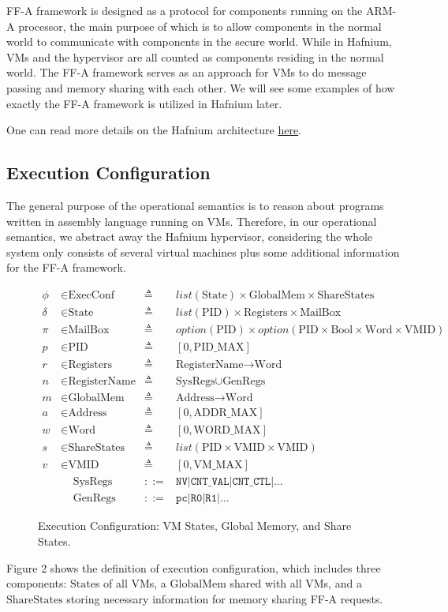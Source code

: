 \documentclass[a4paper]{article}
\newcommand*{\defined}{\triangleq}
\newcommand*{\maps}{\rightarrow}
\newcommand*{\derived}{::=}
\newcommand*{\CONF}{\text{ExecConf}}
\newcommand*{\STATE}{\text{State}}
\newcommand*{\MEM}{\text{GlobalMem}}
\newcommand*{\SSS}{\text{ShareStates}}
\newcommand*{\PID}{\text{PID}}
\newcommand*{\REGS}{\text{Registers}}
\newcommand*{\ADDR}{\text{Address}}
\newcommand*{\WORD}{\text{Word}}
\newcommand*{\VMID}{\text{VMID}}
\newcommand*{\REGNAMES}{\text{RegisterName}}
\newcommand*{\MB}{\text{MailBox}}
\newcommand*{\PAMAX}{\text{ADDR\_MAX}}
\newcommand*{\PPIDMAX}{\text{PID\_MAX}}
\newcommand*{\PWMAX}{\text{WORD\_MAX}}
\newcommand*{\PVMMAX}{\text{VM\_MAX}}
\begin{document}
FF-A framework is designed as a protocol for components running on the ARM-A
processor, the main purpose of which is to allow components in the normal world
to communicate with components in the secure world. While in Hafnium, VMs and
the hypervisor are all counted as components residing in the normal world. The
FF-A framework serves as an approach for VMs to do message passing and
memory sharing with each other. We will see some examples of how exactly the
FF-A framework is utilized in Hafnium later.

One can read more details on the Hafnium architecture
\href{https://review.trustedfirmware.org/plugins/gitiles/hafnium/hafnium/+/HEAD/docs/Architecture.md}{here}.

\subsection{Execution Configuration}
 The general purpose of the operational
semantics is to reason about programs written in assembly language running on
VMs. Therefore, in our operational semantics, we abstract away the Hafnium
hypervisor, considering the whole system only consists of several virtual
machines plus some additional information for the FF-A framework.

\begin{figure}
  \begin{align*}
    \phi &\in \CONF &\defined &list(\STATE) \times \MEM \times \SSS \\
    \delta &\in \STATE &\defined &list(\PID) \times \REGS \times \MB \\
    \pi & \in \MB &\defined &option(\PID) \times option(\PID \times \text{Bool} \times \WORD \times \VMID) \\
    p & \in \PID &\defined  &[ 0, \PPIDMAX ] \\
    r & \in \REGS &\defined  &\REGNAMES \maps \WORD \\
    n & \in \REGNAMES &\defined &\text{SysRegs} \cup \text{GenRegs} \\
    m & \in \MEM &\defined  &\ADDR \maps \WORD \\
    a & \in \ADDR &\defined  &[ 0, \PAMAX ] \\
    w & \in \WORD &\defined  &[ 0, \PWMAX ] \\
    s & \in \SSS &\defined  &list(\PID \times \VMID \times \VMID) \\
    v & \in \VMID &\defined  &[ 0, \PVMMAX ] \\
      & \;\;\;\; \text{SysRegs} &\derived & \mathtt{NV} | \mathtt{CNT\_VAL} | \mathtt{CNT\_CTL} | \dots \\
      & \;\;\;\; \text{GenRegs} &\derived & \mathtt{pc} | \mathtt {R0} | \mathtt{R1} | \dots
  \end{align*}
  \caption{Execution Configuration: VM States, Global Memory, and Share States.}
\end{figure}
Figure 2 shows the definition of execution configuration, which includes three
components: $\STATE$s of all VMs, a $\MEM$ shared with all VMs, and a $\SSS$
storing necessary information for memory sharing FF-A requests.
\end{document}
